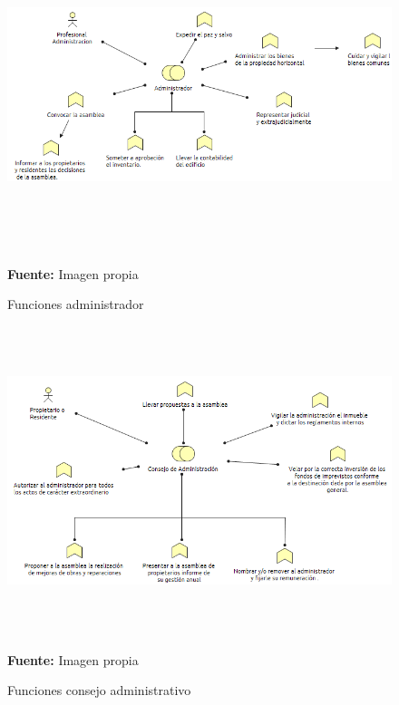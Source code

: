\begin{figure}[th!]
	\centering
	\includegraphics[width=16cm,height=9cm]{arquitectura/negocio/imgs/funciones-1}
	\caption{Funciones administrador}{\scriptsize \textbf{Fuente:} Imagen propia}
\end{figure}

\begin{figure}[th!]
	\centering
	\includegraphics[width=15cm,height=9cm]{arquitectura/negocio/imgs/funciones-2}
	\caption{Funciones consejo administrativo}{\scriptsize \textbf{Fuente:} Imagen propia}
\end{figure}


